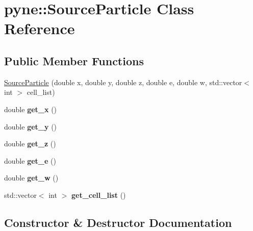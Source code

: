 \hypertarget{classpyne_1_1_source_particle}{}\section{pyne\+:\+:Source\+Particle Class Reference}
\label{classpyne_1_1_source_particle}
\subsection*{Public Member Functions}
\begin{DoxyCompactItemize}
\item 
\hyperlink{classpyne_1_1_source_particle_a846f53ad718dc58644e2b346141d4798}{Source\+Particle} (double x, double y, double z, double e, double w, std\+::vector$<$ int $>$ cell\+\_\+list)
\item 
\mbox{\label{classpyne_1_1_source_particle_a7f3b846bd35379ed54af32f6ded96067}} 
double {\bfseries get\+\_\+x} ()
\item 
\mbox{\label{classpyne_1_1_source_particle_a5ec4c22186d3dad1a5ee653b0f0e5258}} 
double {\bfseries get\+\_\+y} ()
\item 
\mbox{\label{classpyne_1_1_source_particle_af61510f070015b5c67f5ac101e83c3c3}} 
double {\bfseries get\+\_\+z} ()
\item 
\mbox{\label{classpyne_1_1_source_particle_a3cc030d9d6ad67bcb59cb614c6287c45}} 
double {\bfseries get\+\_\+e} ()
\item 
\mbox{\label{classpyne_1_1_source_particle_a132fc1c5f80df8f3c01c8d6ace8c92e5}} 
double {\bfseries get\+\_\+w} ()
\item 
\mbox{\label{classpyne_1_1_source_particle_a21eae69f73cb4c5e323e06d54ad95de0}} 
std\+::vector$<$ int $>$ {\bfseries get\+\_\+cell\+\_\+list} ()
\end{DoxyCompactItemize}


\subsection{Constructor \& Destructor Documentation}
\mbox{\label{classpyne_1_1_source_particle_a846f53ad718dc58644e2b346141d4798}} 
